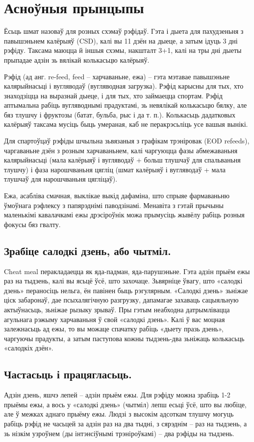 \section{Асноўныя прынцыпы}

Ёсьць шмат назоваў для розных схэмаў рэфідаў. Гэта і дыета для пахудзеньня з павышэньнем калёрыяў (CSD), калі вы 11 дзён на дыеце, а затым ідуць 3 дні рэфіду. Таксама маюцца й іншыя схэмы, накшталт 3+1, калі на тры дні дыеты прыпадае адзін зь вялікай колькасьцю калёрыяў.

Рэфід (ад анг. re-feed, feed – харчаваньне, ежа) – гэта мэтавае павышэньне калярыйнасьці і вугляводаў (вугляводная загрузка). Рэфід карысны для тых, хто знаходзіцца на выразнай дыеце, і для тых, хто займаецца спортам. Рэфід аптымальна рабіць вугляводнымі прадуктамі, зь невялікай колькасьцю бялку, але бяз тлушчу і фруктозы (батат, бульба, рыс і да т. п.). Колькасьць дадатковых калёрыяў таксама мусіць быць умераная, каб не перакрэсьліць усе вашыя вынікі.

Для спартоўцаў рэфіды шчыльна зьвязаныя з графікам трэніровак (EOD refeeds), чаргаваньне дзён з розным харчаваньнем, калі чаргуюцца фазы абмежаваньня калярыйнасьці (мала калёрыяў і вугляводаў + больш тлушчаў для спальваньня тлушчу) і фаза нарошчваньня цягліц (шмат калёрыяў і вугляводаў + мала тлушчаў для нарошчваньня цягліцаў).

Ежа, асабліва смачная, выклікае выкід дафаміна, што спрыяе фармаваньню ўмоўнага рэфлексу з папярэднімі паводзінамі. Менавіта з гэтай прычыны маленькімі кавалачкамі ежы дрэсіроўнік можа прымусіць жывёлу рабіць розныя фокусы бяз гвалту.

\subsection{Зрабіце салодкі дзень, або чытміл.}
Cheat meal перакладаецца як яда-падман, яда-парушэньне. Гэта адзін прыём ежы раз на тыдзень, калі вы ясьцё ўсё, што захочаце. Зьвярніце ўвагу, што «салодкі дзень» пераносіць нельга, ён павінен быць рэгулярным. «Салодкі дзень» зьніжае ціск забаронаў, дае псыхалягічную разгрузку, дапамагае захаваць сацыяльную актыўнасьць, зьніжае рызыку зрываў. Пры гэтым неабходна датрымлівацца агульнага рэжыму харчаваньня ў свой «салодкі дзень». Калі ў вас моцная залежнасьць ад ежы, то вы можаце спачатку рабіць «дыету празь дзень», чаргуючы прадукты, а затым паступова кожны тыдзень-два зьніжаць колькасьць «салодкіх дзён».

\subsection{Частасьць і працягласьць.}
Адзін дзень, яшчэ лепей – адзін прыём ежы. Для рэфіду можна зрабіць 1-2 прыёмы ежы, а вось у «салодкі дзень» (чытміл) лепш есьці ўсё, што вы любіце, але ў межках аднаго прыёму ежы. Людзі з высокім адсоткам тлушчу могуць рабіць рэфід не часьцей за адзін раз на два тыдні, з сярэднім – раз на тыдзень, а зь нізкім узроўнем (ды інтэнсіўнымі трэніроўкамі) – два рэфіды на тыдзень.

